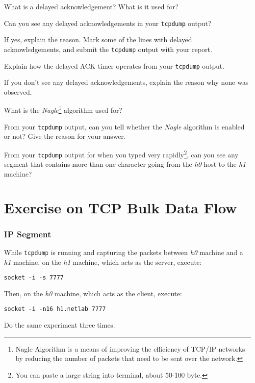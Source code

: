 \documentclass{../UTNetLab}
\begin{document}
    \begin{report}
        \item What is a delayed acknowledgement?
            What is it used for?
        
        \item Can you see any delayed acknowledgements in your \lstinline{tcpdump} output?

            If yes, explain the reason.
            Mark some of the lines with delayed acknowledgements, and submit the \lstinline{tcpdump} output with your report.

            Explain how the delayed ACK timer operates from your \lstinline{tcpdump} output.

            If you don’t see any delayed acknowledgements, explain the reason why none was observed.
        
        \item What is the \textit{Nagle}\footnote{Nagle Algorithm is a means of improving the efficiency of TCP/IP networks by reducing the number of packets that need to be sent over the network.} algorithm used for?

            From your \lstinline{tcpdump} output, can you tell whether the \textit{Nagle} algorithm is enabled or not? Give the reason for your answer.

            From your \lstinline{tcpdump} output for when you typed very rapidly\footnote{You can paste a large string into terminal, about 50-100 byte.}, can you see any segment that contains more than one character going from the \textit{h0} host to the \textit{h1} machine?
    \end{report}

\part{Exercise on TCP Bulk Data Flow}
\section{IP Segment}
    While \lstinline{tcpdump} is running and capturing the packets between \textit{h0} machine and a \textit{h1} machine, on the \textit{h1} machine, which acts as the server, execute:
    \begin{lstlisting}
socket -i -s 7777
    \end{lstlisting}
    Then, on the \textit{h0} machine, which acts as the client, execute:
    \begin{lstlisting}[emph={h1,netlab}]
socket -i -n16 h1.netlab 7777
    \end{lstlisting}
    Do the same experiment three times.
\end{document}
